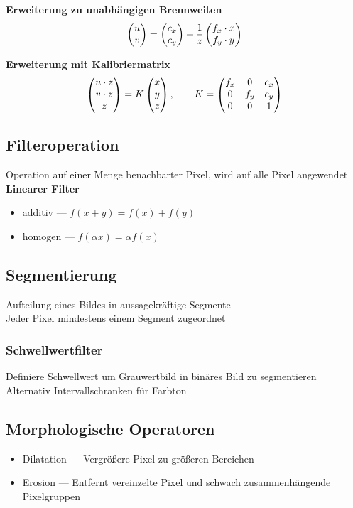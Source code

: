 \textbf{Erweiterung zu unabhängigen Brennweiten}\\
\[\begin{pmatrix}u \\ v\end{pmatrix} = \begin{pmatrix}c_x \\ c_y\end{pmatrix} + \frac{1}{z}\begin{pmatrix}f_x \cdot x \\ f_y \cdot y\end{pmatrix}\]

\textbf{Erweiterung mit Kalibriermatrix}\\
\[\begin{pmatrix}u \cdot z\\ v \cdot z\\ z\end{pmatrix} = K \begin{pmatrix}x \\ y \\ z\end{pmatrix}, \qquad K = \begin{pmatrix}f_x & 0 & c_x\\ 0 & f_y & c_y \\ 0 & 0 & 1\end{pmatrix}\]

\subsection{Filteroperation}
Operation auf einer Menge benachbarter Pixel, wird auf alle Pixel angewendet\\

\textbf{Linearer Filter}
\begin{itemize}
\item additiv --- \(f(x + y) = f(x) + f(y)\)
\item homogen --- \(f(\alpha x) = \alpha f(x)\)
\end{itemize}

\subsection{Segmentierung}
Aufteilung eines Bildes in aussagekräftige Segmente\\
Jeder Pixel mindestens einem Segment zugeordnet

\subsubsection{Schwellwertfilter}
Definiere Schwellwert um Grauwertbild in binäres Bild zu segmentieren\\
Alternativ Intervallschranken für Farbton

\subsection{Morphologische Operatoren}
\begin{itemize}
\item Dilatation --- Vergrößere Pixel zu größeren Bereichen
\item Erosion --- Entfernt vereinzelte Pixel und schwach zusammenhängende Pixelgruppen
\end{itemize}

